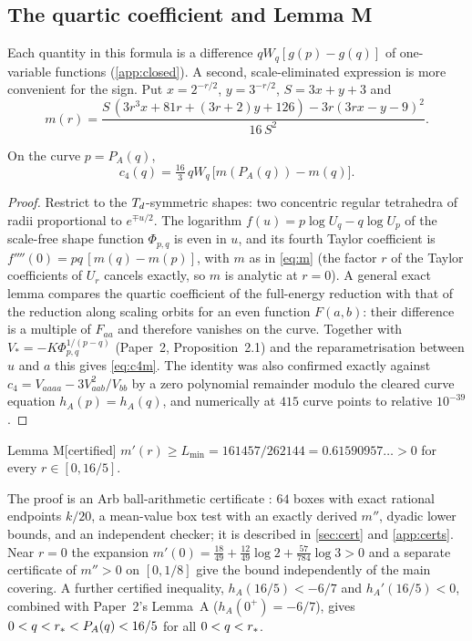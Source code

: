 \subsection{The quartic coefficient and Lemma M}

Each quantity in this formula is a difference $qW_q[g(p)-g(q)]$ of one-variable functions (\cref{app:closed}). A
second, scale-eliminated expression is more convenient for the sign. Put $x=2^{-r/2}$, $y=3^{-r/2}$, $S=3x+y+3$ and
\begin{equation}\label{eq:m}
m(r)=\frac{S\,(3r^3x+81r+(3r+2)y+126)-3r(3rx-y-9)^2}{16\,S^2}.
\end{equation}

\begin{lemma}\label{lem:foliation}
On the curve $p=P_A(q)$,
\begin{equation}\label{eq:c4m}
c_4(q)=\tfrac{16}{3}\,qW_q\,\bigl[m(P_A(q))-m(q)\bigr].
\end{equation}
\end{lemma}
\begin{proof}
Restrict to the $T_{d}$-symmetric shapes: two concentric regular tetrahedra of radii proportional to $e^{\mp u/2}$. The
logarithm $f(u)=p\log U_q-q\log U_p$ of the scale-free shape function $\Phi_{p,q}$ is even in $u$, and its fourth
Taylor coefficient is $f''''(0)=pq\,[m(q)-m(p)]$, with $m$ as in \eqref{eq:m} (the factor $r$ of the Taylor
coefficients of $U_r$ cancels exactly, so $m$ is analytic at $r=0$). A general exact lemma compares the quartic
coefficient of the full-energy reduction with that of the reduction along scaling orbits for an even function $F(a,b)$:
their difference is a multiple of $F_{aa}$ and therefore vanishes on the curve. Together with $V_*=-K\Phi_{p,q}^{1/(p-q)}$
(Paper~2, Proposition~2.1) and the reparametrisation between $u$ and $a$ this gives \eqref{eq:c4m}. The identity was
also confirmed exactly against $c_4=V_{aaaa}-3V_{aab}^2/V_{bb}$ by a zero polynomial remainder modulo the cleared curve
equation $h_A(p)=h_A(q)$, and numerically at $415$ curve points to relative $10^{-39}$.
\end{proof}

\begin{named}{Lemma M}[certified]\label{lem:M}
$m'(r)\ge L_{\min}=161457/262144=0.61590957\ldots>0$ for every $r\in[0,16/5]$.
\end{named}

The proof is an Arb ball-arithmetic certificate \citep{Johansson2017}: $64$ boxes with exact rational endpoints $k/20$,
a mean-value box test with an exactly derived $m''$, dyadic lower bounds, and an independent checker; it is described
in \cref{sec:cert} and \cref{app:certs}. Near $r=0$ the expansion $m'(0)=\frac{18}{49}+\frac{12}{49}\log2+\frac{57}{784}\log3>0$
and a separate certificate of $m''>0$ on $[0,1/8]$ give the bound independently of the main covering. A further
certified inequality, $h_A(16/5)<-6/7$ and $h_A'(16/5)<0$, combined with Paper~2's Lemma~A ($h_A(0^+)=-6/7$), gives
$0<q<r_{*}<P_A(q)<16/5$ for all $0<q<r_{*}$.

